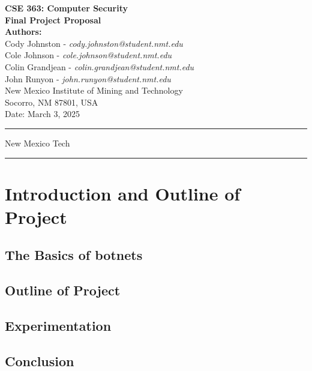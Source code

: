 \documentclass[english,12pt]{article}
\begin{document}
\begin{titlepage}
    \null
    \vspace*{2cm}
    
    \begin{center}
        {\Huge \bfseries CSE 363: Computer Security}\\[1.5cm]
        {\Large \bfseries Final Project Proposal}\\[2cm]
        
        \textbf{Authors:} \\[0.5cm]
        Cody Johnston - \textit{cody.johnston@student.nmt.edu}\\
        Cole Johnson - \textit{cole.johnson@student.nmt.edu}\\
        Colin Grandjean - \textit{colin.grandjean@student.nmt.edu}\\
        John Runyon - \textit{john.runyon@student.nmt.edu}\\
        
        New Mexico Institute of Mining and Technology\\
        Socorro, NM 87801, USA\\[2cm]
        
        {\large Date: March 3, 2025}
    \end{center}
    
    \vfill
    \hrule
    \smallskip
    \centerline{\sc New Mexico Tech}
    \smallskip
    \hrule
\end{titlepage}

{\tableofcontents} 
\pagebreak
\section*{Introduction and Outline of Project}
\subsection*{The Basics of botnets}

\subsection*{Outline of Project}

\subsection*{Experimentation}

\subsection*{Conclusion}
\end{document}
